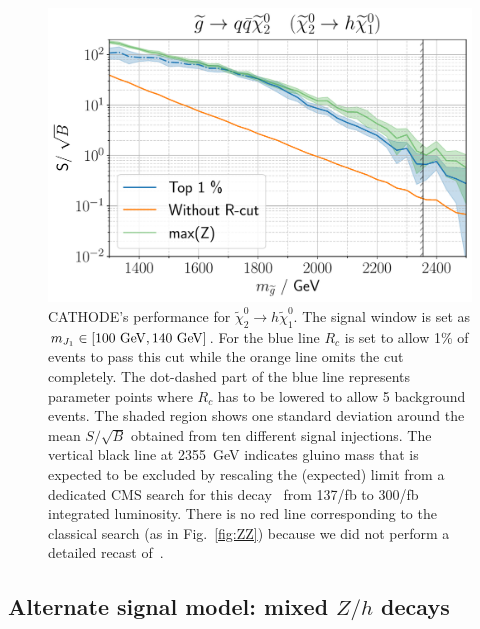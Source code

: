\documentclass[prd, twocolumn, superscriptaddress,floatfix, nofootinbib, preprintnumbers]{revtex4-2}
\begin{document}
\begin{figure}[b]
\centering
\includegraphics[width=0.9\linewidth]{HH.pdf}
\caption{CATHODE's performance for $\widetilde{\chi}_2^0 \rightarrow h \widetilde{\chi}_1^0$. The signal window is set as $m_{J_1} \in [100~{\rm GeV},140~{\rm GeV}]$. For the blue line $R_c$ is set to allow 1\% of events to pass this cut while the orange line omits the cut completely. The dot-dashed part of the blue line represents parameter points where $R_c$ has to be lowered to allow 5 background events. The shaded region shows one standard deviation around the mean $S/\sqrt{B}$ obtained from ten different signal injections. The vertical black line at 2355~{\rm GeV} indicates gluino mass that is expected to be  excluded by rescaling the (expected) limit from a dedicated CMS search for this decay~\cite{CMS:2022vpy} from 137/fb to 300/fb integrated luminosity. There is no red line corresponding to the classical search (as in Fig.~\ref{fig:ZZ})  because we did not perform a detailed recast of~\cite{CMS:2022vpy}. }
\label{fig:HH}
\end{figure}

\subsection{Alternate signal model: mixed \texorpdfstring{$Z/h$}{Z/h} decays}
\end{document}
